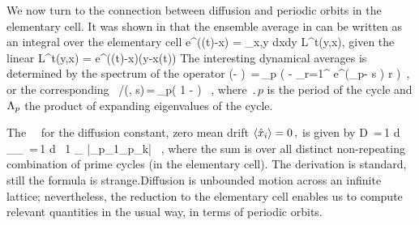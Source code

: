 We now turn to the connection between diffusion and periodic orbits in
the elementary cell. It was shown in  that the ensemble
average in can be written as an integral over the
elementary cell
\beq
\langle e^{\beta\cdot(\hx(t)-x)} \rangle
   = \int_{x,y\in \pS} dxdy {\cal L}^t(y,x),
\eeq
given the linear \evOper
\beq
{\cal L}^t(y,x) = e^{\beta\cdot(\hx(t)-x)}\delta(y-x(t))
\label{eq-eOper}
\eeq
The interesting dynamical averages is determined by the spectrum of the operator
\beq \det(\eigenvL - \Lop) \,=\,\prod_{p} \exp \left(
  - { \sum_{r=1}^ { e^{(\beta \cdot \hn_p- s
        ) r} \over {} }
  } \right) \,,
or the corresponding \dzeta\
/\zeta(\beta, s)\,=\,\prod_{p}\left( 1 - \frac{e^{(\beta \cdot \hn_p-
      s \period{p})}}{|\ExpaEig_p|} \right) ~,
\label{zeta-diff}
\eeq
where $\period{p}$ is the period of the cycle and $\Lambda_p$ the
product of expanding eigenvalues of the cycle\rf{DasBuch}.

The \dzeta\ \cycForm\ for the diffusion constant, zero mean drift
$ \langle { \hat{x}_i } \rangle = 0 \,, $ is given by
 \beq D \,=\,{1  d}
{ _\zeta \over \expct{\period{}}_\zeta } \,=\,{1
  \over 2 d } \, {1 \over \expct{\period{}}_\zeta} \sumprime
{}
{|\ExpaEig_{p_1}\cdots \ExpaEig_{p_k}|} \, ,
\label{eq-ecDiffCoef}
\eeq
where the sum is over all distinct non-repeating combination of prime
cycles (in the elementary cell). The derivation is standard, still the
formula is strange.Diffusion is unbounded motion across an infinite
lattice; nevertheless, the reduction to the elementary cell enables us to
compute relevant quantities in the usual way, in terms of periodic
orbits.
